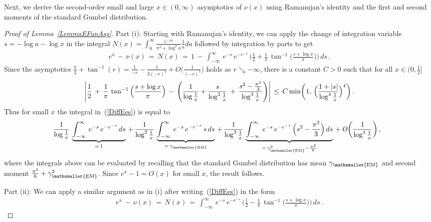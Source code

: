 \documentclass[10pt]{article}
\numberwithin{equation}{section}
\theoremstyle{definition}
\begin{document}
\begin{appendix}
 Next, we derive the second-order  small and large $x\in (0,\infty)$ asymptotics of $\nu(x)$ using Ramanujan's identity and the first and second moments of the standard Gumbel distribution.

\begin{proof}[Proof of Lemma~\ref{LemmaEFunAsy}]  Part (i): Starting with Ramanujan's identity, we can apply the change of integration variable $s= -\log a-\log x$ in  the integral $N(x)=\int_0^{\infty}\frac{ e^{-xa}}{\pi^2+\log^2 a }\frac{1}{a}da $ followed by
integration by parts to get
\begin{align}\label{DiffEes}
e^x\,-\,\nu(x)\,=\,N(x)\,=\,   1\,-\, \int_{-\infty}^{\infty}\,e^{-s}\,e^{-  e^{-s} }\,\bigg(\frac{1}{2}+ \frac{1}{\pi }\,\tan^{-1}\Big(\frac{s+\log x}{\pi} \Big)    \bigg)\,ds  \,.
\end{align}
 Since the asymptotics $\frac{\pi}{2}+ \tan^{-1}(r)= \frac{1}{-r}-\frac{1}{3(-r)^3}+\mathit{O}\big( \frac{1}{(-r)^5}\big) $ holds as $r\searrow -\infty$,  there is a constant $C>0$ such that for all $x\in (0,\frac{1}{2}]$
$$\Bigg|\frac{1}{2}\,+\,\frac{1}{\pi}\,\tan^{-1}\Big(\frac{s+\log x}{\pi}\Big)\,-\,\Bigg(\frac{1}{\log \frac{1}{x}}+\frac{ s }{ \log^2\frac{1}{x} }\,+\,\frac{ s^2-\frac{\pi^2}{3} }{ \log^3\frac{1}{x} }\Bigg)\Bigg|\, \leq \,C\,\textup{min}\bigg(1,\,\Big(\frac{  1+|s| }{ \log^4\frac{1}{x}  }\Big)^4 \bigg) \,. $$
Thus for small $x$ the integral in~(\ref{DiffEes}) is equal to
\begin{align*}
   \,&\,\frac{1}{\log \frac{1}{x}  }\,\underbrace{\int_{-\infty}^{\infty}\,e^{-s}\,e^{-  e^{-s} }\,ds}_{=\,1} \,+\,\frac{1}{\log^2 \frac{1}{x}  }\,\underbrace{\int_{-\infty}^{\infty}\,e^{-s}\,e^{-  e^{-s} }\,s\,ds}_{=\,\gamma_{\mathsmaller{\textup{EM}}}}\,+\,\frac{1}{\log^3 \frac{1}{x}  }\,\underbrace{\int_{-\infty}^{\infty}\,e^{-s}\,e^{-  e^{-s} }\,\Big(s^2-\frac{\pi^2}{3}\Big)\,ds}_{=\,\gamma_{\mathsmaller{\textup{EM}}}^2-\frac{ \pi^2 }{6}}\,+\,\mathit{O}\bigg(\frac{1}{\log^4 \frac{1}{x}  }\bigg)\,,
\end{align*}
where the  integrals above can be evaluated by recalling that the standard Gumbel distribution has mean $\gamma_{\mathsmaller{\textup{EM}}}$ and second moment $\frac{\pi^2}{6}+\gamma_{\mathsmaller{\textup{EM}}}^2  $. Since $e^{x}-1=\mathit{O}(x)$ for small $x$, the result follows. \vspace{.3cm}

\noindent Part (ii):  We can apply a similar argument as in (i) after writing~(\ref{DiffEes}) in the form
\begin{align*}
   e^x\,-\,\nu(x)\,=\,N(x) \,=\,
    \int_{-\infty}^{\infty}\,e^{-s}\,e^{-  e^{-s} }\,\bigg(\frac{1}{2}- \frac{1}{\pi }\,\tan^{-1}\Big(\frac{s+\log x}{\pi} \Big)    \bigg)\,ds\,.
\end{align*}



\end{proof}
\end{appendix}
\end{document}
